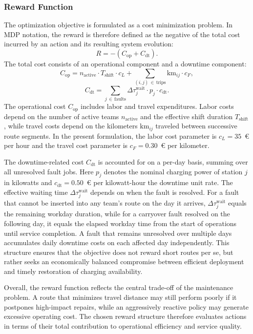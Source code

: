 \documentclass[12pt,oneside]{article}
\begin{document}
\subsubsection{Reward Function}
The optimization objective is formulated as a cost minimization problem. In MDP notation, the reward is therefore defined as the negative of the total cost incurred by an action and its resulting system evolution:
\[
  R = -\left(C_{\mathrm{op}} + C_{\mathrm{dt}}\right).
\]
The total cost consists of an operational component and a downtime component:
\[
  C_{\mathrm{op}} = n_{\mathrm{active}} \cdot T_{\mathrm{shift}} \cdot c_L
    + \sum_{(i,j)\,\in\,\mathrm{trips}} \mathrm{km}_{ij} \cdot c_F,
\]
\[
  C_{\mathrm{dt}} = \sum_{j\,\in\,\mathrm{faults}} \Delta\tau_j^{\mathrm{wait}} \cdot p_j \cdot c_{\mathrm{dt}}.
\]
The operational cost $C_{\mathrm{op}}$ includes labor and travel expenditures. Labor costs depend on the number of active teams $n_{\mathrm{active}}$ and the effective shift duration $T_{\mathrm{shift}}$, while travel costs depend on the kilometers $\mathrm{km}_{ij}$ traveled between successive route segments. In the present formulation, the labor cost parameter is $c_L = 35$~€ per hour and the travel cost parameter is $c_F = 0.30$~€ per kilometer.

The downtime-related cost $C_{\mathrm{dt}}$ is accounted for on a per-day basis, summing over all unresolved fault jobs. Here $p_j$ denotes the nominal charging power of station $j$ in kilowatts and $c_{\mathrm{dt}} = 0.50$~€ per kilowatt-hour the downtime unit rate. The effective waiting time $\Delta\tau_j^{\mathrm{wait}}$ depends on when the fault is resolved. For a fault that cannot be inserted into any team's route on the day it arrives, $\Delta\tau_j^{\mathrm{wait}}$ equals the remaining workday duration, while for a carryover fault resolved on the following day, it equals the elapsed workday time from the start of operations until service completion. A fault that remains unresolved over multiple days accumulates daily downtime costs on each affected day independently. This structure ensures that the objective does not reward short routes per se, but rather seeks an economically balanced compromise between efficient deployment and timely restoration of charging availability.

Overall, the reward function reflects the central trade-off of the maintenance problem. A route that minimizes travel distance may still perform poorly if it postpones high-impact repairs, while an aggressively reactive policy may generate excessive operating cost. The chosen reward structure therefore evaluates actions in terms of their total contribution to operational efficiency and service quality.
\end{document}
